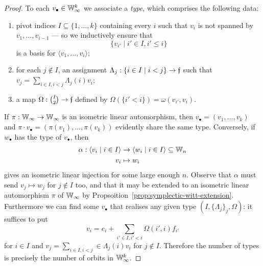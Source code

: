 \begin{proof}
    To each $v_\bullet \in \mathbb{W}_\infty^k$ we associate a \emph{type}, 
    which comprises the following data:
    \begin{enumerate}
        \item 
        pivot indices $I \subseteq \{1, \ldots, k\}$ containing every $i$ 
        such that $v_i$ is not spanned by $v_1, \ldots, v_{i-1}$
        --- so we inductively ensure that $$\{v_{i'} \mid i' \in I, i' \leq i\}$$ is a basis for $\langle v_1, \ldots, v_i \rangle$;

        \item 
        for each $j \not\in I$, an assignment $\Lambda_j : \{i \in I \mid i < j\} \to \mathfrak{f}$
        such that $v_j = \sum_{i \in I, i < j} \Lambda_j(i) v_i$;

        \item 
        a map $\Omega : \binom{I}{2} \to \mathfrak{f}$ defined by $\Omega(\{i' < i\}) = \omega(v_{i'}, v_{i})$.
    \end{enumerate}
    If $\pi : \mathbb{W}_\infty \to \mathbb{W}_\infty$ is an isometric linear automorphism,
    then $v_\bullet = (v_1, \ldots, v_k)$ and $\pi \cdot v_\bullet = (\pi(v_1), \ldots, \pi(v_k))$ evidently share the same type.
    Conversely, if $w_\bullet$ has the type of $v_\bullet$,
    then
    \begin{align*}
        \alpha : \langle v_i \mid i \in I \rangle 
        &\to \langle w_i \mid i \in I \rangle 
        \subseteq \mathbb{W}_n \\
        v_i &\mapsto w_i
    \end{align*}
    gives an isometric linear injection for some large enough $n$.
    Observe that $\alpha$ must send $v_j \mapsto w_j$ for $j \not\in I$ too,
    and that it may be extended to an isometric linear automorphism $\pi$ of $\mathbb{W}_\infty$ by Propsoition~\ref{prop:symplectic-witt-extension}.
    Furthermore we can find some $v_\bullet$ that realises any given type $(I, \{\Lambda_j\}_j, \Omega)$:
    it suffices to put
    \[
        v_i = e_i + \sum_{i' \in I, i' < i} \Omega(i', i) f_{i'}
    \]
    for $i \in I$ and $v_j = \sum_{i \in I, i < j} \in \Lambda_j(i) v_i$ for $j \not\in I$.
    Therefore the number of types is precisely the number of orbits in $\mathbb{W}_\infty^k$.


\end{proof}
